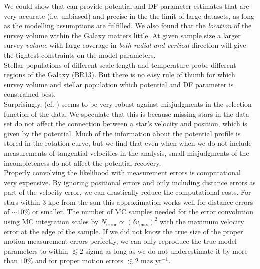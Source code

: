  We could show that \RM{} can provide potential and DF parameter estimates that are very accurate (i.e. unbiased) and precise in the the limit of large datasets, as long as the modelling assumptions are fulfilled. We also found that the \emph{location} of the survey volume within the Galaxy matters little. At given sample size a larger survey \emph{volume} with large coverage in \emph{both radial and vertical} direction will give the tightest constraints on the model parameters. 
\\Stellar populations of different scale length and temperature probe different regions of the Galaxy (BR13). But there is no easy rule of thumb for which survey volume and stellar population which potential and DF parameter is constrained best.\\
Surprisingly, (cf. \citealt{2013A&ARv..21...61R}) \RM{} seems to be very robust against misjudgments in the selection function of the data. We speculate that this is because missing stars in the data set do not affect the connection between a star's velocity and position, which is given by the potential. Much of the information about the potential profile is stored in the rotation curve, but we find that even when when we do not include measurements of tangential velocities in the analysis, small misjudgments of the incompleteness do not affect the potential recovery.\\

 Properly convolving the likelihood with measurement errors is computational very expensive. By ignoring positional errors and only including distance errors as part of the velocity error, we can drastically reduce the computational costs. For stars within 3 kpc from the sun this approximation works well for distance errors of $\sim 10\%$ or smaller. The number of MC samples needed for the error convolution using MC integration scales by $N_\text{error} \propto (\delta v_\text{max})^2$ with the maximum velocity error at the edge of the sample. If we did not know the true size of the proper motion measurement errors perfectly, we can only reproduce the true model parameters to within $\lesssim 2$ sigma \Wilma{[TO DO: Check???]} as long as we do not underestimate it by more than $10\%$ and for proper motion errors $\lesssim 2 \text{ mas yr}^{-1}$.\\

